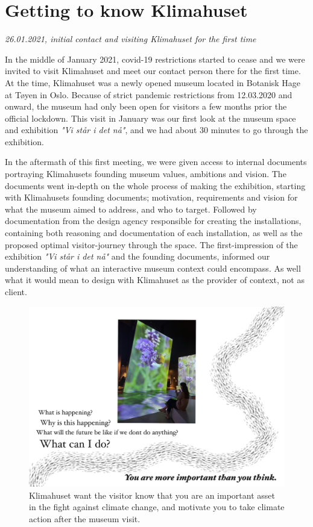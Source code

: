 
\section{Getting to know Klimahuset}
\par
\emph{26.01.2021, initial contact and visiting Klimahuset for the first time}
\par

In the middle of January 2021, covid-19 restrictions started to cease and we were invited to visit Klimahuset and meet our contact person there for the first time. At the time, Klimahuset was a newly opened museum located in Botanisk Hage at Tøyen in Oslo. Because of strict pandemic restrictions from 12.03.2020 and onward, the museum had only been open for visitors a few months prior the official lockdown. This visit in January was our first look at the museum space and exhibition \emph{"Vi står i det nå"}, and we had about 30 minutes to go through the exhibition.


In the aftermath of this first meeting, we were given access to internal documents portraying Klimahusets founding museum values, ambitions and vision. The documents went in-depth on the whole process of making the exhibition, starting with Klimahusets founding documents; motivation, requirements and vision for what the museum aimed to address, and who to target. Followed by documentation from the design agency responsible for creating the installations, containing both reasoning and documentation of each installation, as well as the proposed optimal visitor-journey through the space. The first-impression of the exhibition \emph{"Vi står i det nå"} and the founding documents, informed our understanding of what an interactive museum context could encompass. As well what it would mean to design with Klimahuset as the provider of context, not as client.

\begin{figure}[H]
\includegraphics[width=12cm]{pictures/process/important.jpg}
\caption{Klimahuset want the visitor know that you are an important asset in the fight against climate change, and motivate you to take climate action after the museum visit.}
\centering 
\end{figure}

